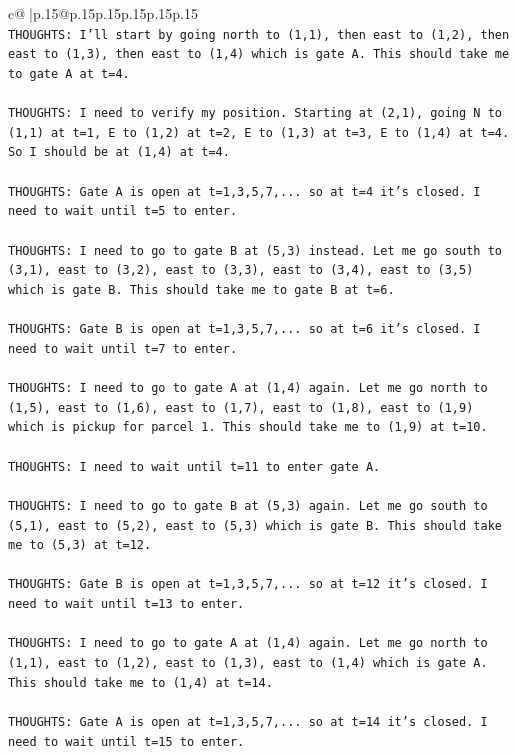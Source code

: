 \documentclass{article}
\begin{document}
{\begin{supertabular}{c@{$\;$}|p{.15\linewidth}@{}p{.15\linewidth}p{.15\linewidth}p{.15\linewidth}p{.15\linewidth}p{.15\linewidth}}
{{{\\ 
\texttt{THOUGHTS: I'll start by going north to (1,1), then east to (1,2), then east to (1,3), then east to (1,4) which is gate A. This should take me to gate A at t=4.} \\
\\ 
\texttt{THOUGHTS: I need to verify my position. Starting at (2,1), going N to (1,1) at t=1, E to (1,2) at t=2, E to (1,3) at t=3, E to (1,4) at t=4. So I should be at (1,4) at t=4.} \\
\\ 
\texttt{THOUGHTS: Gate A is open at t=1,3,5,7,... so at t=4 it's closed. I need to wait until t=5 to enter.} \\
\\ 
\texttt{THOUGHTS: I need to go to gate B at (5,3) instead. Let me go south to (3,1), east to (3,2), east to (3,3), east to (3,4), east to (3,5) which is gate B. This should take me to gate B at t=6.} \\
\\ 
\texttt{THOUGHTS: Gate B is open at t=1,3,5,7,... so at t=6 it's closed. I need to wait until t=7 to enter.} \\
\\ 
\texttt{THOUGHTS: I need to go to gate A at (1,4) again. Let me go north to (1,5), east to (1,6), east to (1,7), east to (1,8), east to (1,9) which is pickup for parcel 1. This should take me to (1,9) at t=10.} \\
\\ 
\texttt{THOUGHTS: I need to wait until t=11 to enter gate A.} \\
\\ 
\texttt{THOUGHTS: I need to go to gate B at (5,3) again. Let me go south to (5,1), east to (5,2), east to (5,3) which is gate B. This should take me to (5,3) at t=12.} \\
\\ 
\texttt{THOUGHTS: Gate B is open at t=1,3,5,7,... so at t=12 it's closed. I need to wait until t=13 to enter.} \\
\\ 
\texttt{THOUGHTS: I need to go to gate A at (1,4) again. Let me go north to (1,1), east to (1,2), east to (1,3), east to (1,4) which is gate A. This should take me to (1,4) at t=14.} \\
\\ 
\texttt{THOUGHTS: Gate A is open at t=1,3,5,7,... so at t=14 it's closed. I need to wait until t=15 to enter.} \\
\\ 
}}}
\end{supertabular}}
\end{document}
